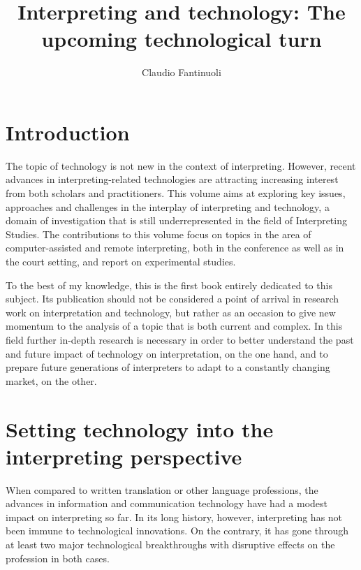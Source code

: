 \documentclass[output=paper]{langsci/langscibook}
\title{Interpreting and technology:\newlineCover{} The upcoming technological turn}
\author{Claudio Fantinuoli\affiliation{Mainz University}}
\begin{document}
\maketitle


 

 
\section{Introduction} 
 
The topic of technology is not new in the context of interpreting. However, recent advances in interpreting-related technologies are attracting increasing interest from both scholars and practitioners. This volume aims at exploring key issues, approaches and challenges in the interplay of interpreting and technology, a domain of investigation that is still underrepresented in the field of Interpreting Studies. The contributions to this volume focus on topics in the area of computer-assisted and remote interpreting, both in the conference as well as in the court setting, and report on experimental studies.
 
To the best of my knowledge, this is the first book entirely dedicated to this subject. Its publication should not be considered a point of arrival in research work on interpretation and technology, but rather as an occasion to give new momentum to the analysis of a topic that is both current and complex. In this field further in-depth research is necessary in order to better understand the past and future impact of technology on interpretation, on the one hand, and to prepare future generations of interpreters to adapt to a constantly changing market, on the other.
 
\section{Setting technology into the interpreting perspective} 
When compared to written translation or other language professions, the advances in information and communication technology have had a modest impact on interpreting so far. In its long history, however, interpreting has not been immune to technological innovations. On the contrary, it has gone through at least two major technological breakthroughs with disruptive effects on the profession in both cases. 
 
\end{document}
